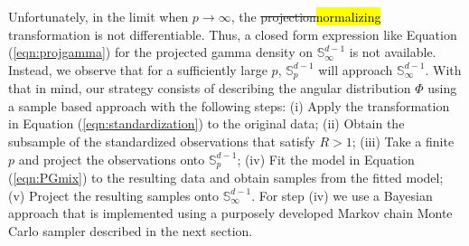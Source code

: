 \documentclass[iicol,sn-basic]{sn-jnl}
\theoremstyle{thmstyleone}
\begin{document}
Unfortunately, in the limit when $p\rightarrow \infty$, the \st{projection}\hl{normalizing} transformation is not differentiable. Thus, a closed form expression like Equation (\ref{eqn:projgamma}) for the projected gamma density on ${\mathbb S}_\infty^{d-1}$ is not available. Instead, we observe that for a sufficiently large $p$, $\mathbb{S}_p^{d-1}$ will approach $\mathbb{S}_{\infty}^{d-1}$.  With that in mind, our strategy consists of describing the angular distribution $\Phi$ using a sample based approach with the following steps: (i) Apply the transformation in Equation (\ref{eqn:standardization}) to the original data; (ii) Obtain the subsample of the standardized observations that satisfy $R>1$; (iii) Take a finite $p$ and project the observations onto ${\mathbb S}_p^{d-1}$; (iv) Fit the model in Equation (\ref{eqn:PGmix}) to the resulting data and obtain samples from the fitted model; (v) Project the resulting samples onto ${\mathbb S}_\infty^{d-1}$. For step (iv) we use a Bayesian approach that is implemented using a purposely developed Markov chain Monte Carlo sampler described in the next section.
\end{document}
